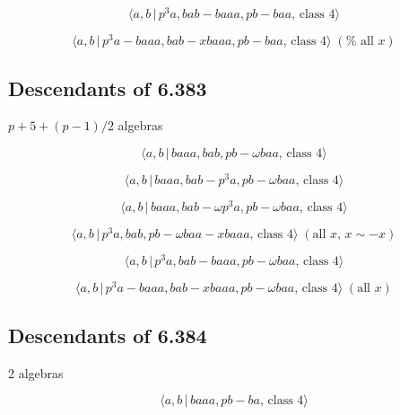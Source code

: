 \documentclass[10pt]{article}
\begin{document}
\begin{equation}
\langle a,b\,|\,p^3a,bab-baaa,pb-baa,\,\text{class }4\rangle  \tag{7.293}
\end{equation}

\begin{equation}
\langle a,b\,|\,p^3a-baaa,bab-xbaaa,pb-baa,\,\text{class }4\rangle \;(\text{%
all }x)  \tag{7.294}
\end{equation}

\subsection{Descendants of 6.383}

$p+5+(p-1)/2$ algebras

\begin{equation}
\langle a,b\,|\,baaa,bab,pb-\omega baa,\,\text{class }4\rangle  \tag{7.295}
\end{equation}

\begin{equation}
\langle a,b\,|\,baaa,bab-p^{3}a,pb-\omega baa,\,\text{class }4\rangle 
\tag{7.296}
\end{equation}

\begin{equation}
\langle a,b\,|\,baaa,bab-\omega p^{3}a,pb-\omega baa,\,\text{class }4\rangle
\tag{7.297}
\end{equation}

\begin{equation}
\langle a,b\,|\,p^{3}a,bab,pb-\omega baa-xbaaa,\,\text{class }4\rangle \;(%
\text{all }x,\,x\sim -x)  \tag{7.298}
\end{equation}

\begin{equation}
\langle a,b\,|\,p^{3}a,bab-baaa,pb-\omega baa,\,\text{class }4\rangle 
\tag{7.299}
\end{equation}

\begin{equation}
\langle a,b\,|\,p^{3}a-baaa,bab-xbaaa,pb-\omega baa,\,\text{class }4\rangle
\;(\text{all }x)  \tag{7.300}
\end{equation}

\subsection{Descendants of 6.384}

2 algebras

\begin{equation}
\langle a,b\,|\,baaa,pb-ba,\,\text{class }4\rangle  \tag{7.301}
\end{equation}
\end{document}
